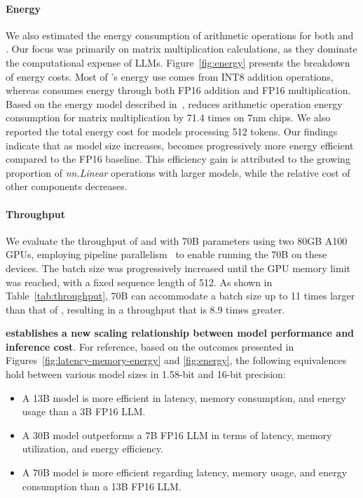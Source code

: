 \paragraph{Energy}

We also estimated the energy consumption of arithmetic operations for both  and . Our focus was primarily on matrix multiplication calculations, as they dominate the computational expense of LLMs. Figure~\ref{fig:energy} presents the breakdown of energy costs. Most of 's energy use comes from INT8 addition operations, whereas  consumes energy through both FP16 addition and FP16 multiplication. Based on the energy model described in~\cite{energycost, pokebnn},  reduces arithmetic operation energy consumption for matrix multiplication by 71.4 times on 7nm chips. We also reported the total energy cost for models processing 512 tokens. Our findings indicate that as model size increases,  becomes progressively more energy efficient compared to the FP16  baseline. This efficiency gain is attributed to the growing proportion of \emph{nn.Linear} operations with larger models, while the relative cost of other components decreases.

\paragraph{Throughput}

We evaluate the throughput of  and  with 70B parameters using two 80GB A100 GPUs, employing pipeline parallelism~\cite{gpipe} to enable running the  70B on these devices. The batch size was progressively increased until the GPU memory limit was reached, with a fixed sequence length of 512. As shown in Table~\ref{tab:throughput},  70B can accommodate a batch size up to 11 times larger than that of , resulting in a throughput that is 8.9 times greater.

\textbf{ establishes a new scaling relationship between model performance and inference cost}. For reference, based on the outcomes presented in Figures~\ref{fig:latency-memory-energy} and \ref{fig:energy}, the following equivalences hold between various model sizes in 1.58-bit and 16-bit precision:

\begin{itemize}
    \item A 13B  model is more efficient in latency, memory consumption, and energy usage than a 3B FP16 LLM.
    \item A 30B  model outperforms a 7B FP16 LLM in terms of latency, memory utilization, and energy efficiency.
    \item A 70B  model is more efficient regarding latency, memory usage, and energy consumption than a 13B FP16 LLM.
\end{itemize}

